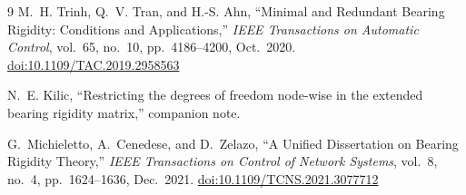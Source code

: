 \documentclass[11pt,a4paper]{article}
\theoremstyle{plain}
\theoremstyle{definition}
\begin{document}
\begin{thebibliography}{9}
M.~H. Trinh, Q.~V. Tran, and H.-S. Ahn,
``Minimal and Redundant Bearing Rigidity: Conditions and Applications,''
\emph{IEEE Transactions on Automatic Control}, vol.~65, no.~10,
pp.~4186--4200, Oct.~2020.
\href{https://doi.org/10.1109/TAC.2019.2958563}{doi:10.1109/TAC.2019.2958563}

N.~E. Kilic, ``Restricting the degrees of freedom node-wise in the extended
bearing rigidity matrix,'' companion note.

G.~Michieletto, A.~Cenedese, and D.~Zelazo,
``A Unified Dissertation on Bearing Rigidity Theory,''
\emph{IEEE Transactions on Control of Network Systems}, vol.~8, no.~4,
pp.~1624--1636, Dec.~2021.
\href{https://doi.org/10.1109/TCNS.2021.3077712}{doi:10.1109/TCNS.2021.3077712}
\end{thebibliography}
\end{document}
